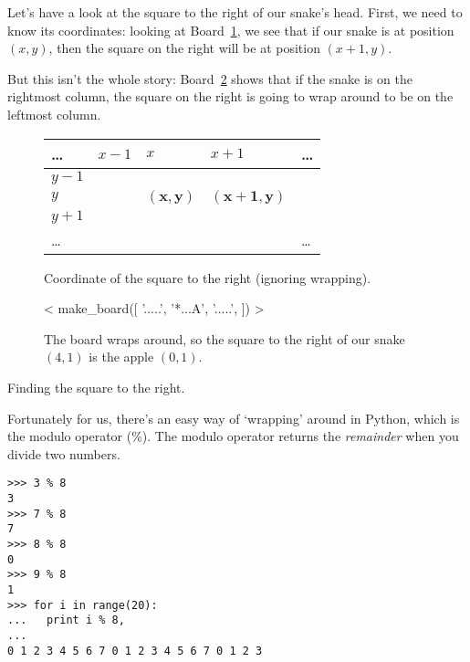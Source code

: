 Let’s have a look at the square to the right of our snake’s head.
First, we need to know its coordinates: looking at
Board~\ref{brd:right-square:normal},
we see that if our snake is at position $(x, y)$,
then the square on the right will be at position $(x + 1, y)$.

But this isn’t the whole story: Board~\ref{brd:right-square:wrapping}
shows that if the snake is on the rightmost column, the square on the right
is going to wrap around to be on the leftmost column.

\begin{board}
\begin{subfigure}{.45\linewidth}
    \begin{tabular}{l|l|l|l|l}
      … & $x-1$ & $x$              & $x + 1$            & … \\\hline
  $y-1$ &       &                  &                    &   \\\hline
  $y$   &       & $\mathbf{(x,y)}$ & $\mathbf{(x+1,y)}$ &   \\\hline
  $y+1$ &       &                  &                    &   \\\hline
      … &       &                  &                    & … \\
    \end{tabular}
\caption{Coordinate of the square to the right (ignoring wrapping).}
\label{brd:right-square:normal}
\end{subfigure}
\hfill
%
\begin{subfigure}{.45\linewidth}
< make_board([
    '.....',
    '*...A',
    '.....',
]) >
\caption{%
    The board wraps around,
    so the square to the right of our snake $(4, 1)$
    is the apple $(0, 1)$.
}
\label{brd:right-square:wrapping}
\end{subfigure}

\caption{Finding the square to the right.}
\label{brd:right-square}
\end{board}

Fortunately for us, there’s an easy way of ‘wrapping’ around in Python,
which is the modulo operator (\%). The modulo operator returns the
\emph{remainder} when you divide two numbers.
\begin{verbatim}
>>> 3 % 8
3
>>> 7 % 8
7
>>> 8 % 8
0
>>> 9 % 8
1
>>> for i in range(20):
...   print i % 8,
... 
0 1 2 3 4 5 6 7 0 1 2 3 4 5 6 7 0 1 2 3
\end{verbatim}

\newcommand\mod{\,\%\,}


